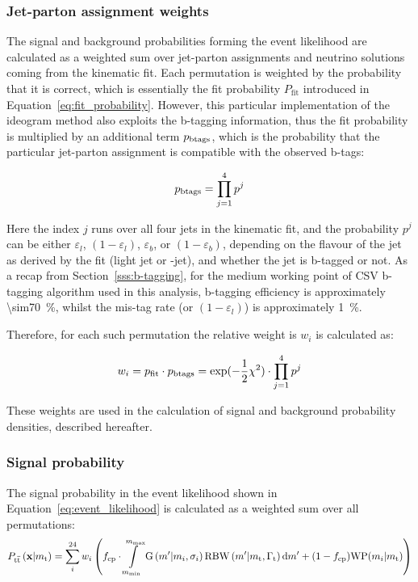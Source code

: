 \subsubsection*{Jet-parton assignment weights}
The signal and background probabilities forming the event likelihood are calculated as a weighted sum over jet-parton
assignments and neutrino solutions coming from the kinematic fit. Each permutation is weighted by the probability that
it is correct, which is essentially the fit probability $P_{\textrm{fit}}$ introduced in
Equation~\ref{eq:fit_probability}. However, this particular implementation of the ideogram method also exploits the
b-tagging information, thus the fit probability is multiplied by an additional term $p_{\rm btags}$, which is the
probability that the particular jet-parton assignment is compatible with the observed b-tags:

\begin{equation}
p_{\rm btags} = \prod_{j=1}^{4} p^{j}
\end{equation}

Here the index $j$ runs over all four jets in the kinematic fit, and the probability $p^{j}$ can be either
$\varepsilon_{l}$, $(1 - \varepsilon_{l})$, $\varepsilon_{b}$, or $(1 - \varepsilon_{b})$, depending on the flavour of
the jet as derived by the fit (light jet or \cPqb-jet), and whether the jet is b-tagged or not. As a recap from
Section~\ref{sss:b-tagging}, for the medium working point of CSV b-tagging algorithm used in this analysis, b-tagging
efficiency is approximately \SI{\sim70}{\percent}, whilst the mis-tag rate (or $(1 - \varepsilon_{l})$) is approximately
\SI{1}{\percent}.

Therefore, for each such permutation the relative weight is $w_i$ is calculated as:

\begin{equation}
w_i = p_{\rm fit} \cdot p_{\rm btags} = \textrm{exp}(-\frac{1}{2}\chi^2) \cdot \prod_{j=1}^{4} p^{j}
\label{eq:permutation_weight}
\end{equation}

These weights are used in the calculation of signal and background probability densities, described hereafter.

\subsubsection*{Signal probability}

The \ttbar signal probability in the event likelihood shown in Equation~\ref{eq:event_likelihood} is calculated as a
weighted sum over all permutations:
\begin{equation}
P_{\mathrm{t}\overline{\mathrm{t}}}\left(\mathbf{x}|m_\mathrm{t}\right) = \sum_{i}^{24} w_{i} \left( f_{\textrm{cp}} \cdot
\int\limits^{m_{\textrm{max}}}_{m_{\textrm{min}}} \textrm{G}\left(m'|m_{i},\sigma_{i}\right) \textrm{RBW}
\left(m'|m_\mathrm{t},\Gamma_{\textrm{t}}\right) \textrm{d}m' + (1 - f_{\textrm{cp}})\textrm{WP}(m_{i}|m_\mathrm{t})\right)
\end{equation}


